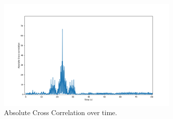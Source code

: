 \documentclass[12pt,a4paper,twoside,openany]{report}
\begin{document}
\begin{figure}[h!]
	\centerline{\includegraphics[width=0.8\textwidth]{figs/cross-correlation.png}}
	\caption{Absolute Cross Correlation over time. }
	\label{fig:cross-correlation}
\end{figure}
\end{document}
